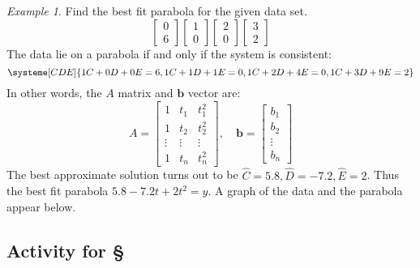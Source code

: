 \documentclass[11pt,oneside]{amsbook}
\theoremstyle{definition}
\theoremstyle{plain}
\theoremstyle{definition}
\theoremstyle{remark}
\newtheorem{example}[theorem]{Example}
\numberwithin{equation}{section}
\numberwithin{figure}{section}
\begin{document}
\begin{example}
  Find the best fit parabola for the given data set.
  \[\begin{bmatrix}0\\6\end{bmatrix}
    \begin{bmatrix}1\\0\end{bmatrix}
    \begin{bmatrix}2\\0\end{bmatrix}
    \begin{bmatrix}3\\2\end{bmatrix}
  \]
  The data lie on a parabola if and only if the system is consistent:
  \[\systeme[CDE]{1C+0D+0E=6,1C+1D+1E=0,1C+2D+4E=0,1C+3D+9E=2}
  \]
  In other words, the $A$ matrix and $\mathbf{b}$ vector are:
  \[A=\begin{bmatrix}
      1&t_1&t_1^2\\
      1&t_2&t_2^2\\
      \vdots&\vdots&\vdots\\
      1&t_n&t_n^2
    \end{bmatrix}
    ,\quad
    \mathbf{b}=\begin{bmatrix}
      b_1\\b_2\\\vdots\\b_n
    \end{bmatrix}
  \]
  The best approximate solution turns out to be $\hat C=5.8,\hat D=-7.2,\hat E=2$. Thus the best fit parabola $5.8-7.2t+2t^2=y$. A graph of the data and the parabola appear below.
  
  \begin{center}
  \end{center}
\end{example}

\newpage
\subsection*{Activity for \S \thesection}
\end{document}
